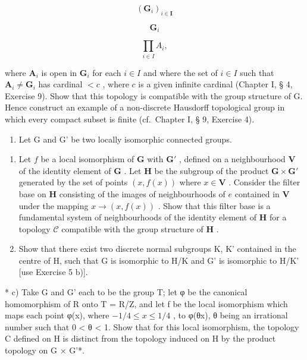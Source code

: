\[
\left(\mathbf {G} _ {i}\right) _ {i \in \mathbf {I}}
\]

\[
\mathbf {G} _ {i}
\]

\[
\prod_ {i \in I} A _ {i},
\]

where \(\mathbf{A}_i\) is open in \(\mathbf{G}_i\) for each \(i \in I\) and where the set of \(i \in I\) such that \(\mathbf{A}_i \neq \mathbf{G}_i\) has cardinal \(< c\) , where \(c\) is a given infinite cardinal (Chapter I, § 4, Exercise 9). Show that this topology is compatible with the group structure of G. Hence construct an example of a non-discrete Hausdorff topological group in which every compact subset is finite (cf.~Chapter I, § 9, Exercise 4).

\begin{enumerate}
\def\labelenumi{\arabic{enumi})}
\setcounter{enumi}{23}
\tightlist
\item
  Let G and G' be two locally isomorphic connected groups.
\end{enumerate}

\begin{enumerate}
\def\labelenumi{\alph{enumi})}
\item
  Let \(f\) be a local isomorphism of \(\mathbf{G}\) with \(\mathbf{G}'\) , defined on a neighbourhood \(\mathbf{V}\) of the identity element of \(\mathbf{G}\) . Let \(\mathbf{H}\) be the subgroup of the product \(\mathbf{G} \times \mathbf{G}'\) generated by the set of points \((x, f(x))\) where \(x \in \mathbf{V}\) . Consider the filter base on \(\mathbf{H}\) consisting of the images of neighbourhoods of \(e\) contained in \(\mathbf{V}\) under the mapping \(x \to (x, f(x))\) . Show that this filter base is a fundamental system of neighbourhoods of the identity element of \(\mathbf{H}\) for a topology \(\mathcal{C}\) compatible with the group structure of \(\mathbf{H}\) .
\item
  Show that there exist two discrete normal subgroups K, K' contained in the centre of H, such that G is isomorphic to H/K and G' is isomorphic to H/K' {[}use Exercise 5 b){]}.
\end{enumerate}

* c) Take G and G' each to be the group T; let φ be the canonical homomorphism of R onto T = R/Z, and let f be the local isomorphism which maps each point φ(x), where \(-1/4 \leqslant x \leqslant 1/4\) , to φ(θx), θ being an irrational number such that 0 \textless{} θ \textless{} 1. Show that for this local isomorphism, the topology C defined on H is distinct from the topology induced on H by the product topology on G × G'*.

